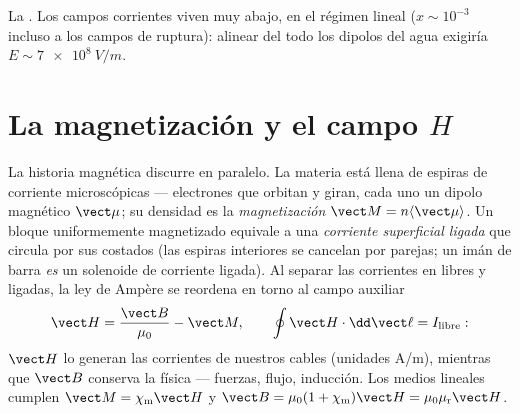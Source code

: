 \begin{omfigure}

{\small La . Los campos corrientes viven muy abajo, en el
régimen lineal ($x \sim 10^{-3}$ incluso a los campos de ruptura): alinear
del todo los dipolos del agua exigiría
$E \sim \qty{7e8}{V/m}$.}
\end{omfigure}

\section{La magnetización y el campo \texorpdfstring{$H$}{H}}

\begin{definition}\label{def:b3:electromagnetism-in-matter:magnetisation}
La historia magnética discurre en paralelo. La materia está llena de espiras
de corriente microscópicas --- electrones que orbitan y giran, cada uno un dipolo
magnético $\vect\mu$; su densidad es la \emph{magnetización}
$\vect M = n\langle\vect\mu\rangle$. Un bloque uniformemente magnetizado equivale
a una \emph{corriente superficial ligada} que circula por sus
costados (las espiras interiores se cancelan por parejas; un imán de barra \emph{es} un
solenoide de corriente ligada). Al separar las corrientes en libres y ligadas,
la ley de Ampère se reordena en torno al campo auxiliar
\[
\vect H = \frac{\vect B}{\mu_0} - \vect M , \qquad
\oint \vect H\cdot\dd\vect\ell = I_{\text{libre}} :
\]
$\vect H$ lo generan las corrientes de nuestros cables (unidades
\unit{A/m}), mientras que $\vect B$ conserva la física --- fuerzas, flujo,
inducción. Los medios lineales cumplen $\vect M = \chi_{\text{m}}\vect H$ y
$\vect B = \mu_0(1 + \chi_{\text{m}})\vect H =
\mu_0\mu_{\text{r}}\vect H$.
\end{definition}

